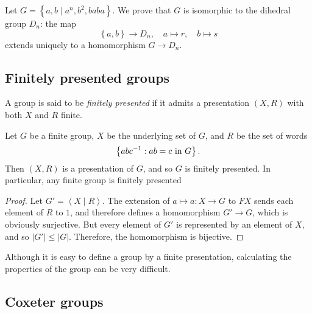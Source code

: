 \begin{example}
  Let \( G = \left\lbrace a, b \mid a^n, b^2, baba \right\rbrace \).
  We prove that \( G \) is isomorphic to the dihedral group \( D_n \): the map
  \[
    \left\lbrace a, b \right\rbrace \to D_n,\quad a \mapsto r,\quad b \mapsto s
  \]
  extends uniquely to a homomorphism \( G \to D_n \).
\end{example}

\subsection{Finitely presented groups}

\begin{definition}
  A group is said to be \emph{finitely presented} if it admits a presentation \(
  (X, R) \) with both \( X \) and \( R \) finite.
\end{definition}

\begin{proposition}
  Let \( G \) be a finite group, \( X \) be the underlying set of \( G \), and
  \( R \) be the set of words
  \[
    \left\lbrace abc^{-1}: ab = c \textmd{ in } G \right\rbrace.
  \]
  Then \( (X, R) \) is a presentation of \( G \), and so \( G \) is
  finitely presented. In particular, any finite group is finitely presented
\end{proposition}
\begin{proof}
  Let \( G' = \left\langle X \mid R \right\rangle \). The extension of \( a
  \mapsto a: X \to G \) to \( FX \) sends each element of \( R \) to \( 1 \),
  and therefore defines a homomorphism \( G' \to G \), which is obviously
  surjective. But every element of \( G' \) is represented by an element of \( X
  \), and so \( \left\vert G' \right\vert \leq \left\vert G \right\vert \).
  Therefore, the homomorphism is bijective.
\end{proof}

Although it is easy to define a group by a finite presentation, calculating the
properties of the group can be very difficult.

\subsection{Coxeter groups}

